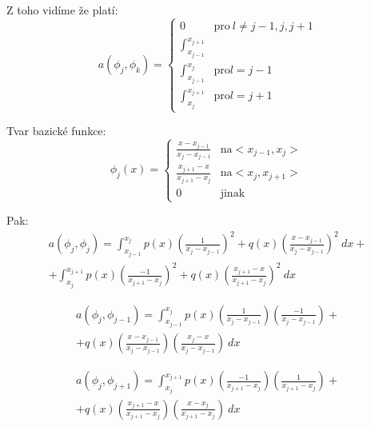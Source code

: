 \documentclass[../main.tex]{subfiles}
\begin{document}
\begin{example}[MKP v 1D]
    
    Z toho vidíme že platí:
    \begin{equation}
        a(\phi_j, \phi_k)=
        \begin{cases}
          0 & \text{pro}\ l\neq j-1, j, j+1 \\
          \int_{x_{j-1}}^{x_{j+1}} \\
          \int_{x_{j-1}}^{x_{j}} & \text{pro} l=j-1\\
          \int_{x_{j}}^{x_{j+1}} & \text{pro} l=j+1
        \end{cases}
      \end{equation}
    
    Tvar bazické funkce: 
    \begin{equation}
        \phi_j(x) = 
        \begin{cases}
            \frac{x-x_{j-1}}{x_j - x_{j-1}} & \text{na} <x_{j-1}, x_j> \\
            \frac{x_{j+1}-x}{x_{j+1} - x_{j}} & \text{na} <x_{j}, x_{j+1}> \\
            0 & \text{jinak}
        \end{cases}
    \end{equation}


Pak:
\begin{multline}
    a(\phi_j, \phi_j) = \int_{x_{j-1}}^{x_j} p(x) \left( \frac{1}{x_j - x_{j-1}} \right)^2 + q(x) \left( \frac{x-x_{j-1}}{x_j-x_{j-1}} \right)^2 \ dx +\\+ \int_{x_j}^{x_{j+1}} p(x) \left( \frac{-1}{x_{j+1} - x_j} \right)^2 + q(x) \left(\frac{x_{j+1}-x}{x_{j+1} - x_j}\right)^2 \ dx 
\end{multline}

\begin{multline}
    a(\phi_j, \phi_{j-1}) = \int_{x_{j-1}}^{x_j}  p(x) \left( \frac{1}{x_j - x_{j-1}} \right)  \left( \frac{-1}{x_{j} - x_{j-1}} \right) +\\+ q(x) \left( \frac{x-x_{j-1}}{x_j-x_{j-1}} \right) \left( \frac{x_j -x}{x_{j} - x_{j-1}} \right) \ dx
\end{multline}

\begin{multline}
    a(\phi_j, \phi_{j+1}) = \int_{x_{j}}^{x_{j+1}}  p(x) \left( \frac{-1}{x_{j+1} - x_{j}} \right)  \left( \frac{1}{x_{j+1} - x_{j}} \right) +\\+ q(x) \left( \frac{x_{j+1}-x}{x_{j+1}-x_{j}} \right) \left( \frac{x - x_j}{x_{j+1} - x_{j}} \right) \ dx
\end{multline}


\end{example}
\end{document}
